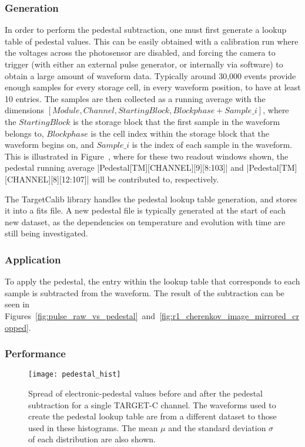 \subsubsection{Generation}

In order to perform the pedestal subtraction, one must first generate a lookup table of pedestal values. This can be easily obtained with a calibration run where the voltages across the photosensor are disabled, and forcing the camera to trigger (with either an external pulse generator, or internally via software) to obtain a large amount of waveform data. Typically around 30,000 events provide enough samples for every storage cell, in every waveform position, to have at least 10 entries. The samples are then collected as a running average with the dimensions $[Module, Channel, Starting Block, Blockphase+Sample\_i]$, where the $Starting Block$ is the storage block that the first sample in the waveform belongs to, $Blockphase$ is the cell index within the storage block that the waveform begins on, and $Sample\_i$ is the index of each sample in the waveform. This is illustrated in Figure~, where for these two readout windows shown, the pedestal running average |Pedestal[TM][CHANNEL][9][8:103]| and |Pedestal[TM][CHANNEL][8][12:107]| will be contributed to, respectively.

The TargetCalib library handles the pedestal lookup table generation, and stores it into a \gls{fits} file. A new pedestal file is typically generated at the start of each new dataset, as the dependencies on temperature and evolution with time are still being investigated.

\subsubsection{Application}

To apply the pedestal, the entry within the lookup table that corresponds to each sample is subtracted from the waveform. The result of the subtraction can be seen in Figures~\ref{fig:pulse_raw_vs_pedestal}~and~\ref{fig:r1_cherenkov_image_mirrored_cropped}. 

\subsubsection{Performance}

\begin{figure}
	\centering
    \texttt{[image: pedestal\_hist]} 
	\caption[Spread of electronic-pedestal values before and after the pedestal subtraction.]{Spread of electronic-pedestal values before and after the pedestal subtraction for a single TARGET-C channel. The waveforms used to create the pedestal lookup table are from a different dataset to those used in these histograms. The mean $\mu$ and the standard deviation $\sigma$ of each distribution are also shown.} 
	\label{fig:pedestalresiduals}
\end{figure}

